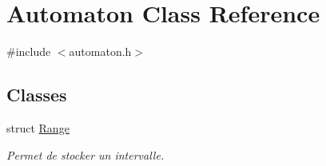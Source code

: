 \hypertarget{class_automaton}{}\section{Automaton Class Reference}
\label{class_automaton}


{\ttfamily \#include $<$automaton.\+h$>$}

\subsection*{Classes}
\begin{DoxyCompactItemize}
\item 
struct \mbox{\hyperlink{struct_automaton_1_1_range}{Range}}
\begin{DoxyCompactList}\small\item\em Permet de stocker un intervalle. \end{DoxyCompactList}\end{DoxyCompactItemize}
